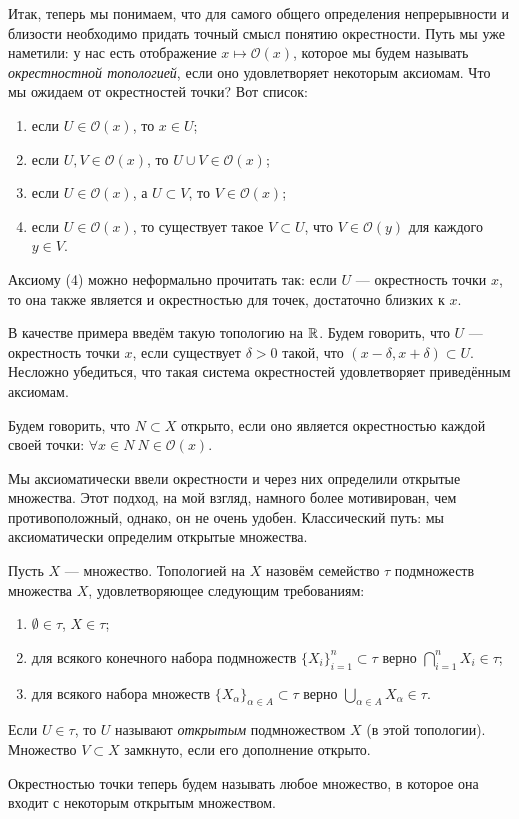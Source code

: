 Итак, теперь мы понимаем, что для самого общего определения непрерывности и близости необходимо придать точный смысл понятию окрестности. Путь мы уже наметили: у нас есть отображение $x\mapsto\mathcal{O}(x)$, которое мы будем называть \textit{окрестностной топологией}, если оно удовлетворяет некоторым аксиомам. Что мы ожидаем от окрестностей точки? Вот список:
\begin{enumerate}
	\item если $U\in\mathcal{O}(x)$, то $x\in U$;
	\item если $U, V\in\mathcal{O}(x)$, то $U\cup V\in\mathcal{O}(x)$;
	\item если $U\in\mathcal{O}(x)$, а $U\subset V$, то $V\in\mathcal{O}(x)$;
	\item если $U\in\mathcal{O}(x)$, то существует такое $V\subset U$, что $V\in\mathcal{O}(y)$ для каждого $y\in V$.
\end{enumerate}
Аксиому (4) можно неформально прочитать так: если $U$ --- окрестность точки $x$, то она также является и окрестностью для точек, достаточно близких к $x$.

В качестве примера введём такую топологию на $\mathbb {R}$. Будем говорить, что $U$ --- окрестность точки $x$, если существует $\delta>0$ такой, что $(x-\delta,x+\delta)\subset U$. Несложно убедиться, что такая система окрестностей удовлетворяет приведённым аксиомам.
\begin{defin}
	Будем говорить, что $N\subset X$ открыто, если оно является окрестностью каждой своей точки: $\forall x\in N\ N\in\mathcal{O}(x)$.
\end{defin}
Мы аксиоматически ввели окрестности и через них определили открытые множества. Этот подход, на мой взгляд, намного более мотивирован, чем противоположный, однако, он не очень удобен. Классический путь: мы аксиоматически определим открытые множества.

\begin{defin}\label{defin:topol}
	Пусть $X$ --- множество. Топологией на $X$ назовём семейство $\tau$ подмножеств множества $X$, удовлетворяющее следующим требованиям:
	\begin{enumerate}
		\item $\emptyset\in\tau$, $X\in\tau$;
		\item для всякого конечного набора подмножеств $\{X_i\}_{i=1}^n\subset\tau$ верно $\bigcap\limits_{i=1}^n X_i\in\tau$;
		\item для всякого набора множеств $\{X_{\alpha}\}_{\alpha\in A}\subset\tau$ верно $\bigcup\limits_{\alpha\in A} X_{\alpha}\in\tau$.
	\end{enumerate}
	Если $U\in\tau$, то $U$ называют \textit{открытым} подмножеством $X$ (в этой топологии). Множество $V\subset X$ замкнуто, если его дополнение открыто.
\end{defin}
Окрестностью точки теперь будем называть любое множество, в которое она входит с некоторым открытым множеством.

